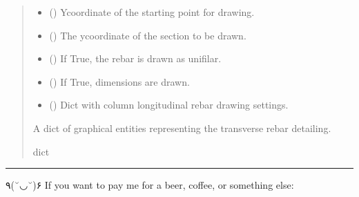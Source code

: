 \documentclass[a4paper,10pt,english]{sphinxmanual}
\begin{document}
\begin{fulllineitems}
\begin{fulllineitems}
\begin{quote}
\begin{description}
\begin{itemize}
\item {} 
\sphinxAtStartPar
{} (\sphinxstyleliteralemphasis{\sphinxupquote{, }}) \textendash{} Y\sphinxhyphen{}coordinate of the starting point for drawing.

\item {} 
\sphinxAtStartPar
{} (\sphinxstyleliteralemphasis{\sphinxupquote{, }}) \textendash{} The y\sphinxhyphen{}coordinate of the section to be drawn.

\item {} 
\sphinxAtStartPar
{} () \textendash{} If True, the rebar is drawn as unifilar.

\item {} 
\sphinxAtStartPar
{} () \textendash{} If True, dimensions are drawn.

\item {} 
\sphinxAtStartPar
{} () \textendash{} Dict with column longitudinal rebar drawing settings.

\end{itemize}

\sphinxAtStartPar
A dict of graphical entities representing the transverse rebar detailing.

\sphinxAtStartPar
dict

\end{description}\end{quote}

\end{fulllineitems}


\end{fulllineitems}



\bigskip\hrule\bigskip


\sphinxAtStartPar
٩(˘◡˘)۶ If you want to pay me for a beer, coffee, or something else: 
\end{document}
